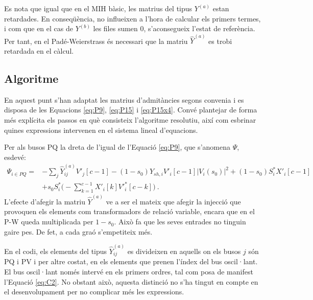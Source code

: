 Es nota que igual que en el MIH bàsic, les matrius del tipus $Y^{(a)}$ estan retardades. En conseqüència, no influeixen a l'hora de calcular els primers termes, i com que en el cas de $Y^{(b)}$ les files sumen 0, s'aconsegueix l'estat de referència. Per tant, en el Padé-Weierstrass és necessari que la matriu $\widehat{Y}^{(a)}$ es trobi retardada en el càlcul.

\subsection{Algoritme}
En aquest punt s'han adaptat les matrius d'admitàncies segons convenia i es disposa de les Equacions \ref{eq:P9}, \ref{eq:P15} i \ref{eq:P15x4}. Convé plantejar de forma més explícita els passos en què consisteix l'algoritme resolutiu, així com esbrinar quines expressions intervenen en el sistema lineal d'equacions. 

Per als busos PQ la dreta de l'igual de l'Equació \ref{eq:P9}, que s'anomena $\Psi$, esdevé:
\begin{equation}
    \begin{split}
    \Psi_{i\in PQ}=&-\sum_{j}\widehat{Y}^{(a)}_{ij}V'_j[c-1]
    -(1-s_0)Y_{sh,i}V'_i[c-1]|V_i(s_0)|^2+(1-s_0)S^*_iX'_i[c-1]\\
    &+s_0S^*_i\biggl(-\sum_{k=1}^{c-1}X'_i[k]V'^{*}_i[c-k]\biggr)\ .
    \end{split}
        \label{eq:C10}
\end{equation}
L'efecte d'afegir la matriu $\widehat{Y}^{(a)}$ ve a ser el mateix que afegir la injecció que provoquen els elements com transformadors de relació variable, encara que en el P-W queda multiplicada per $1-s_0$. Això fa que les seves entrades no tinguin gaire pes. De fet, a cada graó s'empetiteix més.

En el codi, els elements del tipus $\widehat{Y}^{(a)}_{ij}$ es divideixen en aquells on els busos $j$ són PQ i PV i per altre costat, en els elements que prenen l'índex del bus oscil·lant. El bus oscil·lant només intervé en els primers ordres, tal com posa de manifest l'Equació \ref{eq:C2}. No obstant això, aquesta distinció no s'ha tingut en compte en el desenvolupament per no complicar més les expressions.

